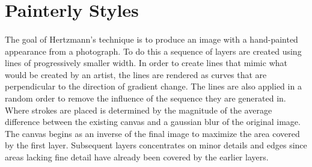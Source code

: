 \documentclass[10pt,twocolumn]{article}
\begin{document}
\section{Painterly Styles}
	\paragraph{} The goal of Hertzmann's technique \cite{Hertzmann:1998:PRC:280814.280951} is to produce an image with a hand-painted appearance from a photograph.  To do this a sequence of layers are created using lines of progressively smaller width.  In order to create lines that mimic what would be created by an artist, the lines are rendered as curves that are perpendicular to the direction of gradient change.  The lines are also applied in a random order to remove the influence of the sequence they are generated in.  Where strokes are placed is determined by the magnitude of the average difference between the existing canvas and a gaussian blur of the original image.  The canvas begins as an inverse of the final image to maximize the area covered by the first layer.  Subsequent layers concentrates on minor details and edges since areas lacking fine detail have already been covered by the earlier layers.
\end{document}
